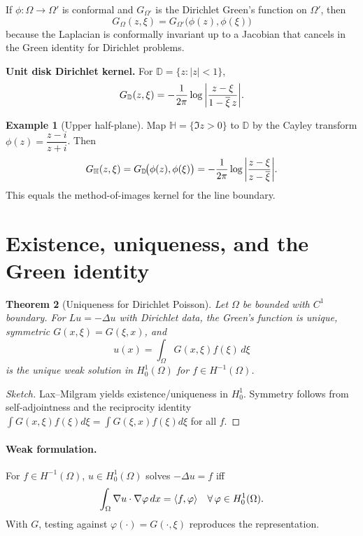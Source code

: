 \documentclass[11pt]{article}
\newtheorem{theorem}{Theorem}[section]
\theoremstyle{definition}
\newtheorem{example}[theorem]{Example}
\theoremstyle{remark}
\newcommand{\D}{\mathbb{D}}
\newcommand{\Om}{\Omega}
\newcommand{\ol}{\overline}
\DeclarePairedDelimiter{\ang}{\langle}{\rangle}
\begin{document}
	If $\phi:\Om\to\Om'$ is conformal and $G_{\Om'}$ is the Dirichlet Green's function on $\Om'$,
	then
	\[
	G_\Om(z,\xi)=G_{\Om'}\big(\phi(z),\phi(\xi)\big)
	\]
	because the Laplacian is conformally invariant up to a Jacobian that cancels in the Green
	identity for Dirichlet problems.
	
	\begin{tcolorbox}
		\textbf{Unit disk Dirichlet kernel.}
		For $\D=\{z:|z|<1\}$,
		\[
		G_{\D}(z,\xi)=-\frac{1}{2\pi}\log\abs{\frac{z-\xi}{1-\ol{\xi}\,z}}.
		\]
	\end{tcolorbox}
	
	\begin{example}[Upper half-plane]
		Map $\mathbb{H}=\{\Im z>0\}$ to $\D$ by the Cayley transform
		$\phi(z)=\dfrac{z-i}{z+i}$. Then
		\[
		G_{\mathbb{H}}(z,\xi)=G_{\D}\!\big(\phi(z),\phi(\xi)\big)
		=-\frac{1}{2\pi}\log\abs{\frac{z-\xi}{z-\ol{\xi}}}.
		\]
		This equals the method-of-images kernel for the line boundary.
	\end{example}
	
	\section{Existence, uniqueness, and the Green identity}
	
	\begin{theorem}[Uniqueness for Dirichlet Poisson]
		Let $\Om$ be bounded with $C^{1}$ boundary. For $Lu=-\Delta u$ with Dirichlet data,
		the Green's function is unique, symmetric $G(x,\xi)=G(\xi,x)$, and
		\[
		u(x)=\int_\Om G(x,\xi) f(\xi)\,d\xi
		\]
		is the unique weak solution in $H_0^1(\Om)$ for $f\in H^{-1}(\Om)$.
	\end{theorem}
	
	\begin{proof}[Sketch]
		Lax–Milgram yields existence/uniqueness in $H_0^1$. Symmetry follows from self-adjointness
		and the reciprocity identity $\int G(x,\xi)f(\xi)d\xi=\int G(\xi,x)f(\xi)d\xi$ for all $f$.
	\end{proof}
	
	\paragraph{Weak formulation.}
	For $f\in H^{-1}(\Om)$, $u\in H_0^1(\Om)$ solves $-\Delta u=f$ iff
	\[
	\int_\Om \nabla u\cdot \nabla \varphi\,dx = \ang{f,\varphi}\quad \forall\,\varphi\in H_0^1(\Om).
	\]
	With $G$, testing against $\varphi(\cdot)=G(\cdot,\xi)$ reproduces the representation.
	
\end{document}
